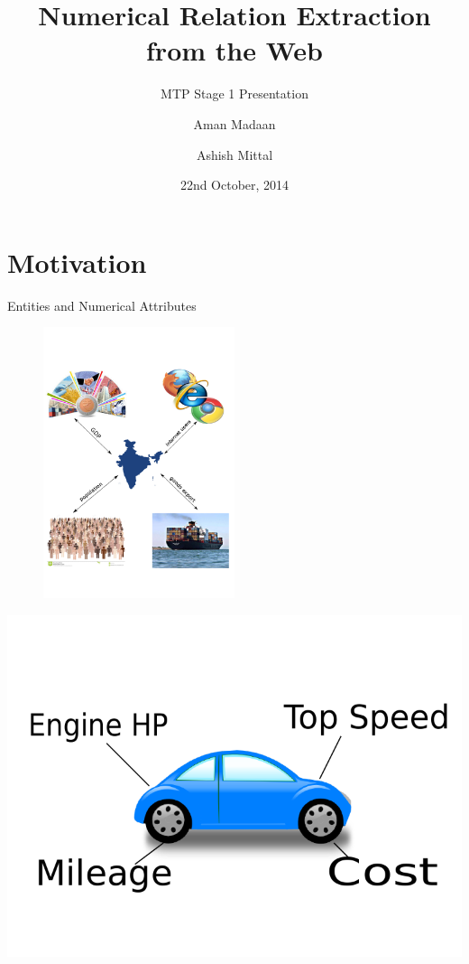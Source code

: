 \documentclass{beamer}
\title{Numerical Relation Extraction from the Web}
\subtitle{MTP Stage 1 Presentation}
\author[]{Aman Madaan \and Ashish Mittal}
\institute[]{
  Indian Institute of Technology Bombay, Mumbai
}
\date{22nd October, 2014}
\begin{document}
\maketitle
\section{Motivation}

\begin{frame}{Entities and Numerical Attributes}

    \begin{figure}
    \centering
    \includegraphics[width = 0.5\textwidth]{images/motivation}
  \end{figure}
 
\end{frame}

\begin{frame}
 \begin{center}
 \includegraphics[scale=0.45]{./imgs/car.pdf}
\end{center}

\end{frame}
\end{document}
